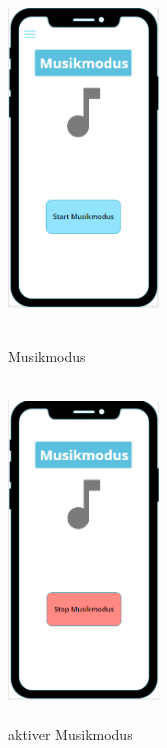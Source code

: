 \documentclass[a4paper,12pt]{article}
\begin{document}
\begin{figure}[ht!]
		\begin{minipage}{0.4\textwidth}
			\includegraphics[width=4cm,height=9cm]{./Benutzeroberflaeche/Musikmodus.png}
			\caption{Musikmodus}
		\end{minipage}
		\hfill
		\begin{minipage}{0.4\textwidth}
			\includegraphics[width=4cm,height=9cm]{./Benutzeroberflaeche/Musikmodus_aktiv.png}
			\caption{aktiver Musikmodus}
			
		\end{minipage}
\end{figure}
\end{document}
